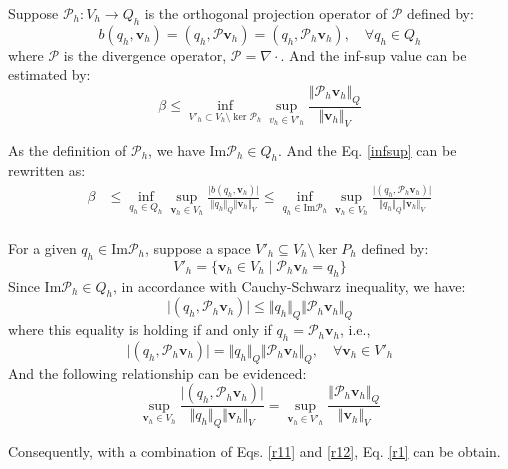 \begin{thm}\label{thm1}
    Suppose $\mathcal P_h:V_h \rightarrow Q_h$ is the orthogonal projection operator of $\mathcal P$ defined by:
\begin{equation}
    b(q_h,\boldsymbol v_h) = (q_h, \mathcal P \boldsymbol v_h) = (q_h, \mathcal P_h \boldsymbol v_h), \quad \forall q_h \in Q_h
\end{equation}
    where $\mathcal P$ is the divergence operator, $\mathcal P = \nabla \cdot$. And the inf-sup value can be estimated by:
\begin{equation}\label{r1}
    \beta \le \inf_{V'_h \subset V_h \setminus \ker \mathcal P_h} \sup_{v_h \in V'_h} \frac{\Vert \mathcal P_h \boldsymbol v_h \Vert_Q}{\Vert \boldsymbol v_h \Vert_V}
\end{equation}
\end{thm}
\begin{pf}
    As the definition of  $\mathcal P_h$, we have $\mathrm{Im}\mathcal P_h \in Q_h$. And the Eq. \eqref{infsup} can be rewritten as:
\begin{equation} \label{r11}
\begin{split}
    \beta &\le \inf_{q_h \in Q_h} \sup_{\boldsymbol v_h \in V_h} \frac{\vert b(q_h,\boldsymbol v_h) \vert}{\Vert q_h \Vert_Q \Vert \boldsymbol v_h \Vert_V} 
    \le \inf_{q_h \in \mathrm{Im}\mathcal P_h} \sup_{\boldsymbol v_h \in V_h} \frac{\vert (q_h,\mathcal P_h \boldsymbol v_h) \vert}{\Vert q_h \Vert_Q \Vert \boldsymbol v_h \Vert_V} \\
\end{split}
\end{equation}

    For a given $q_h\in \mathrm{Im}\mathcal P_h$, suppose a space $V'_h \subseteq V_h\setminus \ker P_h$ defined by:
\begin{equation}
    V'_h = \{ \boldsymbol v_h \in V_h \; \vert \; \mathcal P_h \boldsymbol v_h = q_h \}
\end{equation}
    Since $\mathrm{Im}\mathcal P_h \in Q_h$, in accordance with Cauchy-Schwarz inequality, we have:
\begin{equation}
    \vert (q_h,\mathcal P_h \boldsymbol v_h) \vert \le \Vert q_h \Vert_Q \Vert \mathcal P_h \boldsymbol v_h \Vert_Q
\end{equation}
where this equality is holding if and only if $q_h=\mathcal P_h \boldsymbol v_h$, i.e.,
\begin{equation}
    \vert (q_h,\mathcal P_h \boldsymbol v_h) \vert = \Vert q_h \Vert_Q \Vert \mathcal P_h \boldsymbol v_h \Vert_Q, \quad \forall \boldsymbol v_h \in V'_h
\end{equation}
And the following relationship can be evidenced:
    \begin{equation}\label{r12}
    \sup_{\boldsymbol v_h\in V_h} \frac{\vert (q_h,\mathcal P_h \boldsymbol v_h) \vert}{\Vert q_h \Vert_Q \Vert \boldsymbol v_h \Vert_V} =
    \sup_{\boldsymbol v_h\in V'_h} \frac{\Vert \mathcal P_h \boldsymbol v_h \Vert_Q}{\Vert \boldsymbol v_h \Vert_V} 
\end{equation}

    Consequently, with a combination of Eqs. \eqref{r11} and \eqref{r12}, Eq. \eqref{r1} can be obtain.
\end{pf}


